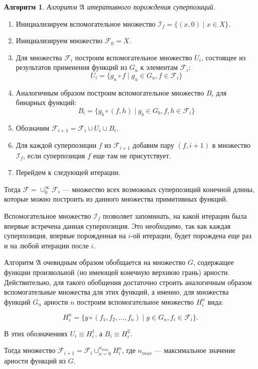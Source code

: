 \documentclass[12pt,a4paper]{amsart}
\newtheorem{algo}{Алгоритм}
\begin{document}
\begin{algo}
  Алгоритм $\mathfrak{A}$ итеративного порождения суперпозиций.
\end{algo}
\begin{enumerate}
  \item Инициализируем вспомогательное множество $\mathcal{I}_f = \{ (x, 0) \mid x \in X \}$.
  \item Инициализируем множество $\mathcal{F}_0 = X$.
  \item Для множества $\mathcal{F}_i$ построим вспомогательное множество $U_i$,
	состоящее из результатов применения функций из $G_u$ к элементам $\mathcal{F}_i$:
	\[
	U_i = \{ g_u \circ f \mid g_u \in G_u, f \in \mathcal{F}_i \}
	\]
  \item Аналогичным образом построим вспомогательное множество $B_i$ для
	бинарных функций:
	\[
	B_i = \{ g_b \circ (f, h) \mid g_b \in G_b, f, h \in \mathcal{F}_i \}
	\]
  \item Обозначим $\mathcal{F}_{i+1} = \mathcal{F}_i \cup U_i \cup B_i$.
  \item Для каждой суперпозиции $f$ из $\mathcal{F}_{i+1}$ добавим пару
	$(f, i+1)$ в множество $\mathcal{I}_f$, если суперпозиция $f$ еще там
	не присутствует.
  \item Перейдем к следующей итерации. 
\end{enumerate}

Тогда $\mathcal{F} = \cup_0^\infty \mathcal{F}_i$ --- множество всех
возможных суперпозиций конечной длины, которые можно построить из
данного множества примитивных функций.

Вспомогательное множество $\mathcal{I}_f$ позволяет запоминать, на какой
итерации была впервые встречена данная суперпозиция. Это необходимо, так
как каждая суперпозиция, впервые порожденная на $i$-ой итерации, будет
порождена еще раз и на любой итерации после $i$.

Алгоритм $\mathfrak{A}$ очевидным образом обобщается на множество $G$,
содержащее функции произвольной (но имеющей конечную верхнюю грань)
арности. Действительно, для такого обобщения достаточно строить аналогичным
образом вспомогательные множества для этих функций, а именно, для множества
функций $G_n$ арности $n$ построим вспомогательное множество $H_i^n$ вида:

\[
H_i^n = \{ g \circ (f_1, f_2, \dots, f_n) \mid g \in G_n, f_i \in \mathcal{F}_i \}.
\]

В этих обозначениях $U_i \equiv H_i^1$, а $B_i \equiv H_i^2$.

Тогда множество $\mathcal{F}_{i+1} = \mathcal{F}_i \cup_{n=0}^{n_{max}} H_i^n$,
где $n_{max}$ --- максимальное значение арности функций из $G$.
\end{document}
